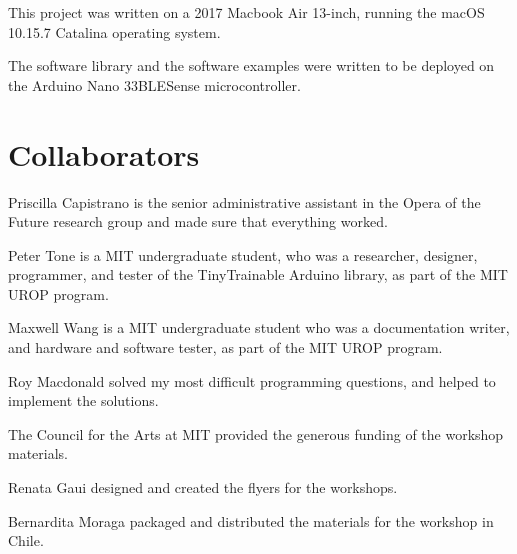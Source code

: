 This project was written on a 2017 Macbook Air 13-inch, running the macOS 10.15.7 Catalina operating system.

The software library and the software examples were written to be deployed on the Arduino Nano 33\acrshort{BLE}Sense microcontroller.

\section{Collaborators}

Priscilla Capistrano is the senior administrative assistant in the Opera of the Future research group and made sure that everything worked.

Peter Tone is a MIT undergraduate student, who was a researcher, designer, programmer, and tester of the TinyTrainable Arduino library, as part of the MIT UROP program.

Maxwell Wang is a MIT undergraduate student who was a documentation writer, and hardware and software tester, as part of the MIT UROP program.

Roy Macdonald solved my most difficult programming questions, and helped to implement the solutions.

The Council for the Arts at MIT provided the generous funding of the workshop materials.

Renata Gaui designed and created the flyers for the workshops.

Bernardita Moraga packaged and distributed the materials for the workshop in Chile.

\newpage
